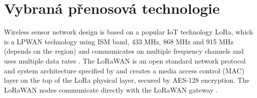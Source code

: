 \section{Vybraná přenosová technologie}
Wireless sensor network design is based on a popular IoT technology LoRa, which is a LPWAN technology using ISM band, 433 MHz, 868 MHz and 915 MHz (depends on the region) and communicates on multiple frequency channels and uses multiple data rates \cite{LoRaWAN Evaluation for IoT Communications}.
The LoRaWAN is an open standard network protocol and system architecture specified by \cite{LoRaWAN specification} and creates a media access control (MAC) layer on the top of the LoRa physical layer, secured by AES-128 encryption.
The LoRaWAN nodes communicate directly with the LoRaWAN gateway \cite{Internet of Things (IoT) using LoRa technology}.


